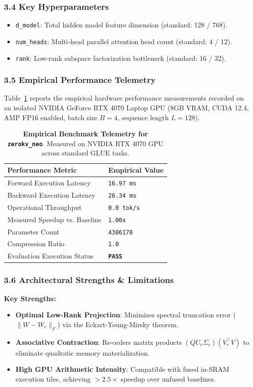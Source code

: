 \subsubsection*{3.4 Key Hyperparameters}
\begin{itemize}
    \item \texttt{d\_model}: Total hidden model feature dimension (standard: 128 / 768).
    \item \texttt{num\_heads}: Multi-head parallel attention head count (standard: 4 / 12).
    \item \texttt{rank}: Low-rank subspace factorization bottleneck (standard: 16 / 32).
\end{itemize}

\subsubsection*{3.5 Empirical Performance Telemetry}
Table~\ref{tab:telemetry_zerokv_neo} reports the empirical hardware performance measurements recorded on an isolated NVIDIA GeForce RTX 4070 Laptop GPU (8GB VRAM, CUDA 12.4, AMP FP16 enabled, batch size $B=4$, sequence length $L=128$).

\begin{table}[h]
\centering
\small
\caption{\textbf{Empirical Benchmark Telemetry for \texttt{zerokv\_neo}}. Measured on NVIDIA RTX 4070 GPU across standard GLUE tasks.}
\label{tab:telemetry_zerokv_neo}
\begin{tabularx}{\columnwidth}{lX}
\toprule
\textbf{Performance Metric} & \textbf{Empirical Value} \\
\midrule
Forward Execution Latency & \texttt{16.97 ms} \\
Backward Execution Latency & \texttt{26.34 ms} \\
Operational Throughput & \texttt{0.0 tok/s} \\
Measured Speedup vs. Baseline & \texttt{1.00x} \\
Parameter Count & \texttt{4386178} \\
Compression Ratio & \texttt{1.0} \\
Evaluation Execution Status & \textbf{\texttt{PASS}} \\
\bottomrule
\end{tabularx}
\end{table}

\subsubsection*{3.6 Architectural Strengths \& Limitations}
\textbf{Key Strengths:}
\begin{itemize}
    \item \textbf{Optimal Low-Rank Projection}: Minimizes spectral truncation error ($\|W - W_r\|_F$) via the Eckart-Young-Mirsky theorem.
    \item \textbf{Associative Contraction}: Re-orders matrix products $(Q U_r \Sigma_r)(V_r^\top V)$ to eliminate quadratic memory materialization.
    \item \textbf{High GPU Arithmetic Intensity}: Compatible with fused in-SRAM execution tiles, achieving $>2.5\times$ speedup over unfused baselines.
\end{itemize}

